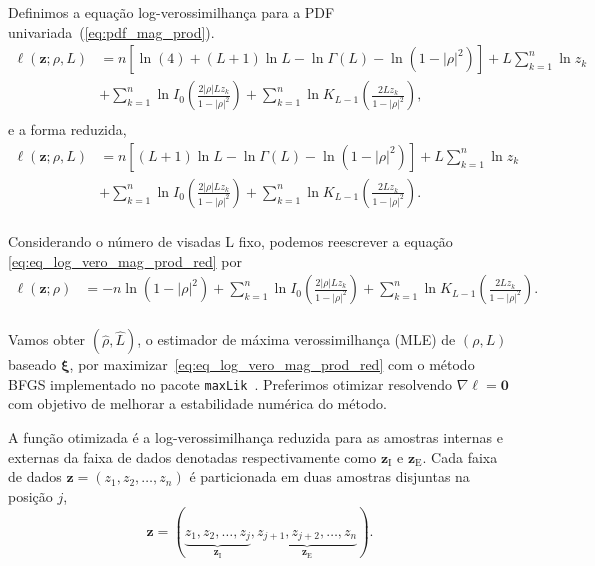 Definimos a equação log-verossimilhança para a PDF univariada~(\ref{eq:pdf_mag_prod}).
\begin{equation}\nonumber
\begin{split}
    \ell(\bm z;\rho, L)&=n\left[\ln (4)+(L+1)\ln L-\ln\Gamma(L)-\ln(1-|\rho|^2)\right]+L\sum_{k=1}^{n} \ln z_k\\
                         &+\sum_{k=1}^{n}\ln I_0\left(\frac{2|\rho|Lz_k}{1-|\rho|^2}\right)+ \sum_{k=1}^{n}\ln K_{L-1}\left(\frac{2Lz_k}{1-|\rho|^2}\right),\\
\end{split}
 \end{equation}
e a forma reduzida,
\begin{equation}\label{eq:eq_log_vero_mag_prod_red}
\begin{split}
    \ell(\bm z;\rho, L)&=n\left[(L+1)\ln L-\ln\Gamma(L)-\ln(1-|\rho|^2)\right]+L\sum_{k=1}^{n} \ln z_k\\
                         &+\sum_{k=1}^{n}\ln I_0\left(\frac{2|\rho|L z_k}{1-|\rho|^2}\right)+ \sum_{k=1}^{n}\ln K_{L-1}\left(\frac{2Lz_k}{1-|\rho|^2}\right).\\
\end{split}
 \end{equation} 

Considerando o número de visadas L fixo, podemos reescrever a equação \eqref{eq:eq_log_vero_mag_prod_red} por
\begin{equation}\label{eq:eq_log_vero_mag_prod_red}
\begin{split}
    \ell(\bm z;\rho)&=-n\ln(1-|\rho|^2) +\sum_{k=1}^{n}\ln I_0\left(\frac{2|\rho|L z_k}{1-|\rho|^2}\right)+ \sum_{k=1}^{n}\ln K_{L-1}\left(\frac{2Lz_k}{1-|\rho|^2}\right).\\
\end{split}
 \end{equation} 


Vamos obter $(\widehat \rho, \widehat L)$, o estimador de máxima verossimilhança (MLE) de $(\rho, L)$ baseado $\bm \xi$, por maximizar~\eqref{eq:eq_log_vero_mag_prod_red} com o método BFGS implementado no pacote \texttt{maxLik}~\citep{ht}. Preferimos otimizar resolvendo $\nabla\ell=\bm 0$ com objetivo de melhorar a estabilidade numérica do método.

A função otimizada é a log-verossimilhança reduzida para as amostras internas e externas da faixa de dados denotadas respectivamente como $\bm z_\text{I}$ e $\bm z_\text{E}$. Cada faixa de dados $\bm z = (z_1,z_2,\dots,z_n)$ é particionada em duas amostras disjuntas na posição $j$,  
$$
\bm z = (\underbrace{z_1,z_2,\dots,z_j}_{\bm z_\text{I}}, 
\underbrace{z_{j+1}, z_{j+2},\dots,z_n}_{\bm z_\text{E}}).
$$

